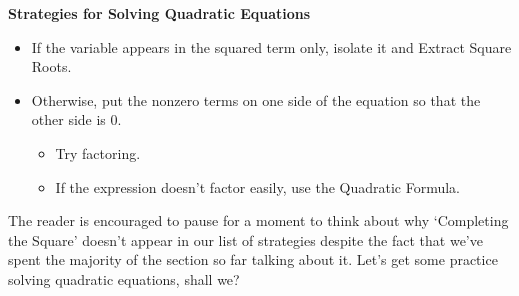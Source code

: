 \documentclass[10pt]{article}
\begin{document}
\colorbox{ResultColor}{\bbm
\centerline{\textbf{Strategies for Solving Quadratic Equations}}

\begin{itemize}

\item  If the variable appears in the squared term only, isolate it and Extract Square Roots.
\item  Otherwise, put the nonzero terms on one side of the equation so that the other side is $0$.
\begin{itemize}
\item  Try factoring.  
\item  If the expression doesn't factor easily, use the Quadratic Formula.

\end{itemize}
\end{itemize}

\ebm}

\medskip

The reader is encouraged to pause for a moment to think about why `Completing the Square' doesn't appear in our list of strategies despite the fact that we've spent the majority of the section so far talking about it. Let's get some practice solving quadratic equations, shall we?
\end{document}
